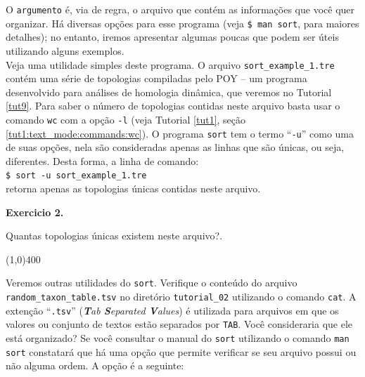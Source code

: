 \begin{refsection}
O \texttt{argumento} é, via de regra, o arquivo que contém as informações que você quer organizar. Há diversas opções para esse programa (veja \texttt{\$ man sort}, para maiores detalhes); no entanto, iremos apresentar algumas poucas que podem ser úteis utilizando alguns exemplos.\\

Veja uma utilidade simples deste programa. O arquivo \texttt{sort\_example\_1.tre} contém uma série de topologias compiladas pelo POY \parencite[][]{VaronETAL_2010, VaronETAL_2014} -- um programa desenvolvido para análises de homologia dinâmica, que veremos no Tutorial \ref{tut9}. Para saber o número de topologias contidas neste arquivo basta usar o comando \texttt{wc} com a opção \texttt{-l} (veja Tutorial \ref{tut1}, seção \ref{tut1:text_mode:commands:wc}). O programa \texttt{sort} tem o termo ``\texttt{-u}'' como uma de suas opções, nela são consideradas apenas as linhas que são únicas, ou seja, diferentes. Desta forma, a linha de comando:\\

\texttt{\$ sort -u sort\_example\_1.tre}\\

retorna apenas as topologias únicas contidas neste arquivo. \\

\begin{blackBlock}{\textbf{Exercicio 2.}}\label{tut2:ex:2.3}

Quantas topologias únicas existem neste arquivo?.

\end{blackBlock}

\begin{center}
\line(1,0){400}\\
\end{center}

\vspace{30pt}


Veremos outras utilidades do \texttt{sort}. Verifique o conteúdo do arquivo \texttt{random\_taxon\_table.tsv} no diretório \texttt{tutorial\_02} utilizando o comando \texttt{cat}. A extenção ``\texttt{.tsv}'' (\textit{\textbf{T}ab \textbf{S}eparated \textbf{V}alues}) é utilizada para arquivos em que os valores ou conjunto de textos estão separados por \texttt{TAB}. Você consideraria que ele está organizado? Se você consultar o manual do \texttt{sort} utilizando o comando \texttt{man sort} constatará que há uma opção que permite verificar se seu arquivo possui ou não alguma ordem. A opção é a seguinte:\\


\end{refsection}
